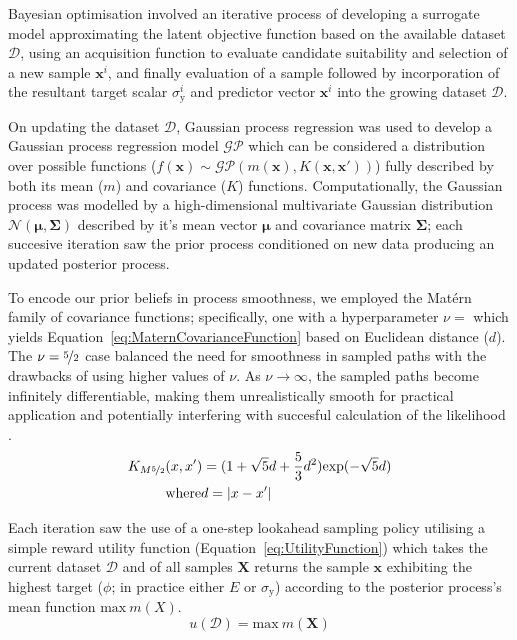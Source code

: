 Bayesian optimisation involved an iterative process of developing a surrogate
 model approximating the latent objective function based on the available
 dataset \(\mathcal{D}\), using an acquisition function to evaluate
 candidate suitability and selection of a new sample \(\mathbf{x}^{i}\), and
 finally evaluation of a sample followed by incorporation of the resultant
 target scalar \(\sigma_{\mathrm{y}}^{i}\) and predictor vector \(\mathbf{x}^{i}\)
 into the growing dataset \(\mathcal{D}\).

On updating the dataset \(\mathcal{D}\), Gaussian process regression was used
 to develop a Gaussian process regression model \(\mathcal{GP}\) which can
 be considered a distribution over possible functions
 (\(f(\mathbf{x})\sim \mathcal{GP}(m(\mathbf{x}),K(\mathbf{x},\mathbf{x}'))\))
 fully described by both its mean (\(m\)) and covariance (\(K\)) functions.
Computationally, the Gaussian process was modelled by a high-dimensional
 multivariate Gaussian distribution \(\mathcal{N}(\bm{\mu},\bm{\Sigma})\)
 described by it's mean vector \(\bm{\mu}\) and covariance matrix
 \(\bm{\Sigma}\); each succesive iteration saw the prior process conditioned
 on new data producing an updated posterior process.

To encode our prior beliefs in process smoothness, we
 employed the Mat\'{e}rn family of covariance functions; specifically,
 one with a hyperparameter \(\nu=\) which yields
 Equation~\ref{eq:MaternCovarianceFunction} based on Euclidean distance
 (\(d\)).
The \(\nu=\nicefrac{5}{2}\) case balanced the need for smoothness in sampled
 paths with the drawbacks of using higher values of \(\nu\). 
As \(\nu \rightarrow \infty\), the sampled paths become infinitely
 differentiable, making them unrealistically smooth for practical
 application \autocite{Snoek2012} and potentially interfering with succesful
 calculation of the likelihood \autocite{Stein1999}.
\footnotesize
\begin{equation}\label{eq:MaternCovarianceFunction}
    \begin{split}
        K_{M\nicefrac{5}{2}}&(x,x')=(1+\sqrt{5}d+\frac{5}{3}d^{2})\mathrm{exp}(-\sqrt{5}d)\\
        &\mathrm{where } d=|x-x'|
    \end{split}
\end{equation}
\normalsize

Each iteration saw the use of a one-step lookahead sampling policy utilising
 a simple reward utility function (Equation~\ref{eq:UtilityFunction}) which
 takes the current dataset \(\mathcal{D}\) and of all samples \(\mathbf{X}\)
 returns the sample \(\mathbf{x}\) exhibiting the highest target
 (\(\phi\); in practice either \(E\) or \(\sigma_{\mathrm{y}}\)) according to the
 posterior process's mean function \(\mathrm{max}\ m(X)\).
\begin{equation}\label{eq:UtilityFunction}
    u(\mathcal{D})=\mathrm{max}\ m(\mathbf{X})
\end{equation}

